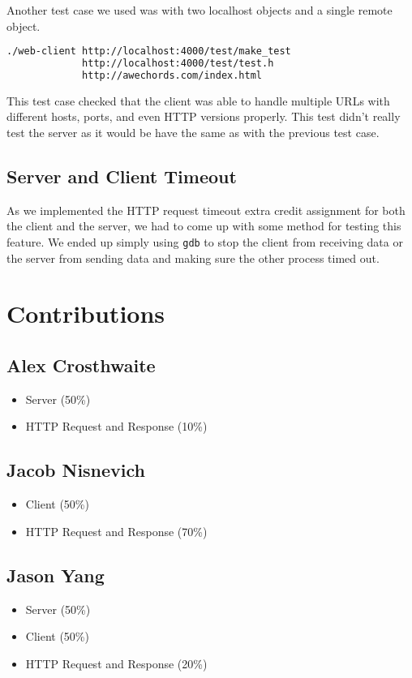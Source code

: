 \documentclass{article}
\begin{document}
Another test case we used was with two localhost objects and a single remote object.

\begin{lstlisting}[language=bash]
./web-client http://localhost:4000/test/make_test 
             http://localhost:4000/test/test.h
             http://awechords.com/index.html
\end{lstlisting}

\noindent
This test case checked that the client was able to handle multiple URLs with different hosts, ports, and even HTTP versions properly. This test didn't really test the server as it would be have the same as with the previous test case.

\subsection{Server and Client Timeout}

As we implemented the HTTP request timeout extra credit assignment for both the client and the server, we had to come up with some method for testing this feature. We ended up simply using \texttt{gdb} to stop the client from receiving data or the server from sending data and making sure the other process timed out.

\section{Contributions}

\subsection{Alex Crosthwaite}

\begin{itemize}
	\item Server (50\%)
    \item HTTP Request and Response (10\%)
\end{itemize}

\subsection{Jacob Nisnevich}

\begin{itemize}
	\item Client (50\%)
	\item HTTP Request and Response (70\%)
\end{itemize}

\subsection{Jason Yang}

\begin{itemize}
	\item Server (50\%)
	\item Client (50\%)
	\item HTTP Request and Response (20\%)
\end{itemize}
\end{document}
